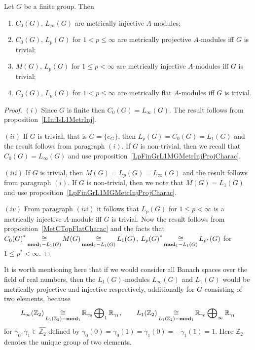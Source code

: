 \begin{proposition}\label{StdModFinGrL1MGMetrInjProjFlatCharac} Let $G$ be a
finite group. Then

\begin{enumerate}[label = (\roman*)]
    \item $C_0(G)$, $L_\infty(G)$ are metrically injective $A$-modules;

    \item $C_0(G)$, $L_p(G)$ for $1<p\leq\infty$ are metrically projective
    $A$-modules iff $G$ is trivial;

    \item $M(G)$, $L_p(G)$ for $1\leq p<\infty$ are metrically injective
    $A$-modules iff $G$ is trivial;

    \item $C_0(G)$, $L_p(G)$ for $1<p\leq\infty$ are metrically 
    flat $A$-modules iff $G$ is trivial.
\end{enumerate}
\end{proposition}
\begin{proof}
$(i)$ Since $G$ is finite then $C_0(G)=L_\infty(G)$. The result follows from
proposition~\ref{LInfIsL1MetrInj}.

$(ii)$ If $G$ is trivial, that is $G= \{e_G \}$, then $L_p(G)=C_0(G)=L_1(G)$ and
the result follows from paragraph $(i)$. If $G$ is non-trivial, then we recall
that $C_0(G)=L_\infty(G)$ and use
proposition~\ref{LpFinGrL1MGMetrInjProjCharac}.

$(iii)$ If $G$ is trivial, then $M(G)=L_p(G)=L_\infty(G)$ and the result follows
from paragraph $(i)$. If $G$ is non-trivial, then we note that $M(G)=L_1(G)$ and
use proposition~\ref{LpFinGrL1MGMetrInjProjCharac}.

$(iv)$ From paragraph $(iii)$ it follows that $L_p(G)$ for $1\leq p<\infty$ is a 
metrically injective $A$-module iff $G$ is trivial. Now the result follows from
proposition~\ref{MetCTopFlatCharac} and the facts that
${C_0(G)}^*\mathop{\mathbin{\cong}}\limits_{\mathbf{mod}_1-L_1(G)}M(G)\mathop{\mathbin{\cong}}\limits_{\mathbf{mod}_1-L_1(G)}L_1(G)$,
${L_p(G)}^*\mathop{\mathbin{\cong}}\limits_{\mathbf{mod}_1-L_1(G)}L_{p^*}(G)$ for $1\leq p^*<\infty$.
\end{proof}

It is worth mentioning here that if we would consider all Banach spaces over the
field of real numbers, then the $L_1(G)$-modules $L_\infty(G)$ and $L_1(G)$ 
would be metrically projective and injective respectively, 
additionally for $G$ consisting of two elements, because
$$
L_\infty(\mathbb{Z}_2)
\mathop{\mathbin{\cong}}\limits_{L_1(\mathbb{Z}_2)-\mathbf{mod}_1}
\mathbb{R}_{\gamma_0}\bigoplus\nolimits_1\mathbb{R}_{\gamma_1},
\qquad
L_1(\mathbb{Z}_2)
\mathop{\mathbin{\cong}}\limits_{L_1(\mathbb{Z}_2)-\mathbf{mod}_1}
\mathbb{R}_{\gamma_0}\bigoplus\nolimits_\infty\mathbb{R}_{\gamma_1}
$$
for $\gamma_0,\gamma_1\in\widehat{\mathbb{Z}_2}$ defined by
$\gamma_0(0)=\gamma_0(1)=\gamma_1(0)=-\gamma_1(1)=1$. Here $\mathbb{Z}_2$
denotes the unique group of two elements.


